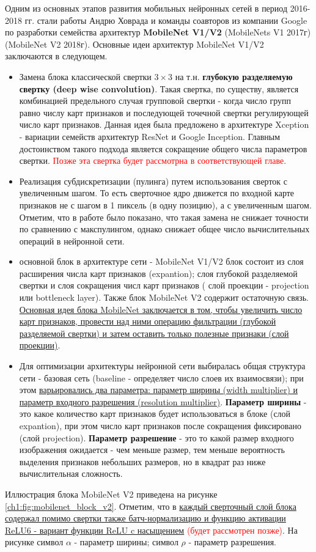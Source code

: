 \documentclass[12pt]{article}
\begin{document}
\begin{sloppypar}
Одним из основных этапов развития мобильных нейронных сетей в период 2016-2018 гг. стали работы Андрю Ховрада и команды соавторов из компании Google по разработки семейства архитектур \textbf{MobileNet V1/V2}\cite{howard2017mobilenets} (MobileNets V1 2017г) \cite{sandler2018mobilenetv2} (MobileNet V2 2018г). Основные идеи архитектур MobileNet V1/V2 заключаются в следующем.
\begin{itemize}
\item Замена блока классической свертки $3\times 3$ на т.н. \textbf{глубокую разделяемую свертку (deep wise convolution)}. Такая свертка, по существу, является комбинацией предельного случая групповой свертки - когда число групп равно числу карт признаков и последующей точечной свертки регулирующей число карт признаков. Данная идея была предложено в архитектуре Xception \cite{chollet2017xception} - вариации семейств архитектур ResNet и Google Inception. Главным достоинством такого подхода является сокращение общего числа параметров свертки. 
\textcolor{red}{Позже эта свертка будет рассмотрна в соответствующей главе}.
\item Реализация субдискретизации (пулинга) путем использования сверток с увеличенным шагом. То есть сверточное ядро движется по входной карте признаков не с шагом в 1 пиксель (в одну позицию), а с увеличенным шагом. Отметим, что в работе \cite{springenberg2014striving} было показано, что такая замена не снижает точности по сравнению с макспулингом, однако снижает общее число вычислительных операций в нейронной сети.
\item основной блок в архитектуре сети - MobileNet V1/V2 блок состоит из слоя расширения числа карт признаков (expantion); слоя глубокой разделяемой свертки и слоя сокращения числ карт признаков ( слой проекции - projection или bottleneck layer). Также блок MobileNet V2 содержит остаточную связь. \uline{Основная идея блока MobileNet заключается в том, чтобы увеличить число карт признаков, провести над ними операцию фильтрации (глубокой разделяемой свертки) и затем оставить только полезные признаки (слой проекции)}.
\item Для оптимизации архитектуры нейронной сети выбиралась общая структура сети  - базовая сеть (baseline - определяет число слоев их взаимосвязи); при этом \uline{варьировались два параметра: параметр ширины (width multiplier) и параметр входного разрешения (resolution multiplier)}. \textbf{Параметр ширины} - это какое количество карт признаков будет использоваться в блоке (слой expantion), при этом число карт признаков после сокращения фиксировано (слой projection). \textbf{Параметр разрешение}  - это то какой размер входного изображения ожидается - чем меньше размер, тем меньше вероятность выделения признаков небольших размеров, но в квадрат раз ниже вычислительная сложность.
\end{itemize}
Иллюстрация блока MobileNet V2 приведена на рисунке \ref{ch1:fig:mobilenet_block_v2}. Отметим, что в \uline{каждый сверточный слой блока содержал помимо свертки также батч-нормализацию и функцию активации ReLU6 - вариант функции ReLU c насыщением} \textcolor{red}{(будет рассмотрен позже)}. На рисунке символ $\alpha$ - параметр ширины; символ $\rho$ - параметр разрешения.


\end{sloppypar}
\end{document}

